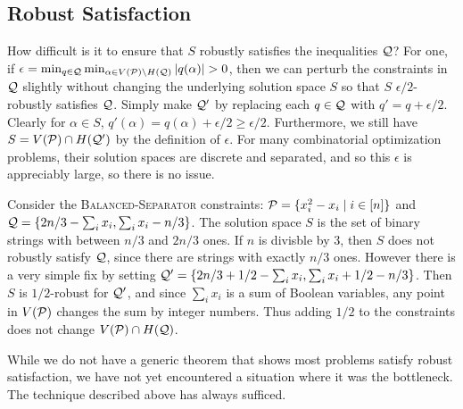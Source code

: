 \subsection{Robust Satisfaction}
How difficult is it to ensure that $S$ robustly satisfies the inequalities $\mathcal Q$? For one, if $\epsilon = \min_{q \in \mathcal Q} \min_{\alpha \in V(\mathcal P) \setminus H(\mathcal Q)} |q(\alpha)| > 0$, then we can perturb the constraints in $\mathcal Q$ slightly without changing the underlying solution space $S$ so that $S$ $\epsilon/2$-robustly satisfies $\mathcal Q$. Simply make $\mathcal Q'$ by replacing each $q \in \mathcal Q$ with $q' = q + \epsilon/2$. Clearly for $\alpha \in S$, $q'(\alpha) = q(\alpha) + \epsilon/2 \geq \epsilon/2$. Furthermore, we still have $S = V(\mathcal P) \cap H(\mathcal Q')$ by the definition of $\epsilon$. For many combinatorial optimization problems, their solution spaces are discrete and separated, and so this $\epsilon$ is appreciably large, so there is no issue. 
\begin{example}
Consider the \textsc{Balanced-Separator} constraints: $\mathcal P = \{x_i^2 - x_i \mid i \in [n]\}$ and $\mathcal Q = \{2n/3 - \sum_i x_i, \sum_i x_i - n/3\}$. The solution space $S$ is the set of binary strings with between $n/3$ and $2n/3$ ones. If $n$ is divisble by $3$, then $S$ does not robustly satisfy $\mathcal Q$, since there are strings with exactly $n/3$ ones. However there is a very simple fix by setting $\mathcal Q' = \{2n/3 + 1/2 - \sum_i x_i, \sum_i x_i + 1/2 - n/3\}$. Then $S$ is $1/2$-robust for $\mathcal Q'$, and since $\sum_i x_i$ is a sum of Boolean variables, any point in $V(\mathcal P)$ changes the sum by integer numbers. Thus adding $1/2$ to the constraints does not change $V(\mathcal P) \cap H(\mathcal Q)$.
\end{example}
While we do not have a generic theorem that shows most problems satisfy robust satisfaction, we have not yet encountered a situation where it was the bottleneck. The technique described above has always sufficed.

